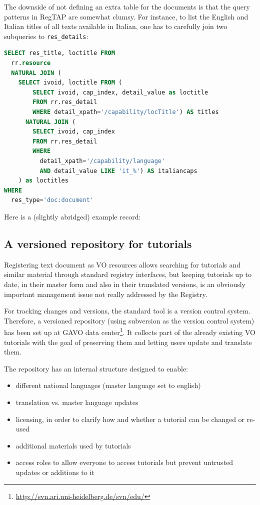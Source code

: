 \documentclass{ivoa}
\begin{document}
The downside of not defining an extra table for the documents is that
the query patterns in RegTAP are somewhat clumsy.  For instance, to list
the English and Italian titles of all texts available in Italian, one
has to carefully join two subqueries to \verb|res_details|:

\begin{lstlisting}[language=SQL]
SELECT res_title, loctitle FROM
  rr.resource 
  NATURAL JOIN (
    SELECT ivoid, loctitle FROM (
        SELECT ivoid, cap_index, detail_value as loctitle
        FROM rr.res_detail
        WHERE detail_xpath='/capability/locTitle') AS titles
      NATURAL JOIN (
        SELECT ivoid, cap_index 
        FROM rr.res_detail
        WHERE 
          detail_xpath='/capability/language'
          AND detail_value LIKE 'it_%') AS italiancaps
    ) as loctitles
WHERE
  res_type='doc:document'
\end{lstlisting}


Here is a (slightly abridged) example record:



\subsection{A versioned repository for tutorials}

\label{sect:svn-repo}

Registering text document as VO resources allows searching for tutorials
and similar 
material through standard registry interfaces, but keeping 
tutorials up to date, in their master form and also in their translated 
versions, is an obviously important management issue not really
addressed by the Registry.

For tracking changes and versions, the standard tool is a version
control system.  Therefore,
a versioned repository (using subversion as the version control system) 
has been set up at GAVO data
center\footnote{\url{http://svn.ari.uni-heidelberg.de/svn/edu/}}.
It collects part of the
already existing VO tutorials with the goal of preserving them and
letting users 
update and translate them.

The repository has an internal structure designed to enable:

\begin{itemize}

\item different national languages (master language set to english){}

\item translation vs. master language updates{}

\item licensing, in order to clarify how and whether a tutorial can be changed or re-used{}

\item additional materials used by tutorials{}

\item access roles to allow everyone to access tutorials but prevent untrusted updates or additions to it{}

\end{itemize}
\end{document}
